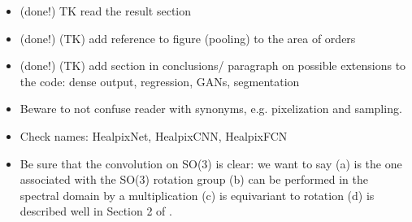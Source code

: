 \documentclass[final,twocolumn,3p,times,authoryear]{elsarticle}
\newcommand{\todo}[1]{{\color[rgb]{.6,.1,.6}{#1}}}
\newcommand{\1}{\b{1}}              %
\newcommand{\0}{\b{0}}              %
\begin{document}
\begin{itemize}[noitemsep,topsep=0pt,parsep=0pt,partopsep=0pt]
    \item (done!) TK read the result section
    \item (done!) (TK) add reference to figure (pooling) to the area of orders
    \item (done!) (TK) add section in conclusions/ paragraph on possible extensions to the code: dense output, regression, GANs, segmentation
	\item Beware to not confuse reader with synonyms, e.g. pixelization and sampling.
    \item Check names: HealpixNet, HealpixCNN, HealpixFCN
    \item Be sure that the convolution on SO(3) is clear: we want to say (a) is the one associated with the SO(3) rotation group (b) can be performed  in the spectral domain by a multiplication (c) is equivariant to rotation (d) is described well in Section 2 of \citep{kondor2018clebsch}.
\end{itemize}
\end{document}
